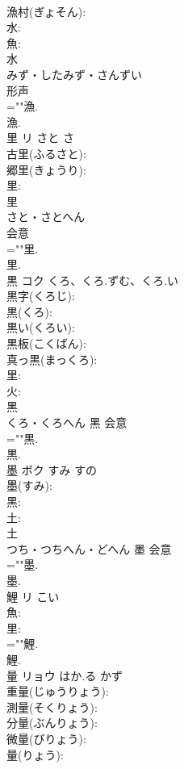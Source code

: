 \documentclass[8pt]{extreport}
\begin{document}
\begin{CJK}{UTF8}{min}
\\	漁村(ぎょそん): 
\\	水: 
\\	魚: 
\\	水	
\\	みず・したみず・さんずい	
\\	形声 
\\	=""漁.
\\	漁.
\\	里	リ	さと	さ	
\\	古里(ふるさと): 
\\	郷里(きょうり): 
\\	里: 
\\	里	
\\	さと・さとへん	
\\	会意 
\\	=""里.
\\	里.
\\	黒	コク	くろ、くろ.ずむ、くろ.い		
\\	黒字(くろじ): 
\\	黒(くろ): 
\\	黒い(くろい): 
\\	黒板(こくばん): 
\\	真っ黒(まっくろ): 
\\	里: 
\\	火: 
\\	黑	
\\	くろ・くろへん	黑	会意 
\\	=""黒.
\\	黒.
\\	墨	ボク	すみ	すの	
\\	墨(すみ): 
\\	黑: 
\\	土: 
\\	土	
\\	つち・つちへん・どへん	墨	会意 
\\	=""墨.
\\	墨.
\\	鯉	リ	こい		
\\	魚: 
\\	里: 
\\	=""鯉.
\\	鯉.
\\	量	リョウ	はか.る	かず	
\\	重量(じゅうりょう): 
\\	測量(そくりょう): 
\\	分量(ぶんりょう): 
\\	微量(びりょう): 
\\	量(りょう): 

\end{CJK}
\end{document}

